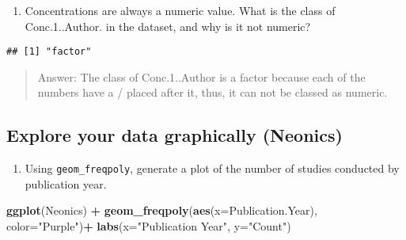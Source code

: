 \documentclass[]{article}
\newenvironment{Shaded}{\begin{snugshade}}{\end{snugshade}}
\newcommand{\DataTypeTok}[1]{\textcolor[rgb]{0.13,0.29,0.53}{#1}}
\newcommand{\DecValTok}[1]{\textcolor[rgb]{0.00,0.00,0.81}{#1}}
\newcommand{\KeywordTok}[1]{\textcolor[rgb]{0.13,0.29,0.53}{\textbf{#1}}}
\newcommand{\NormalTok}[1]{#1}
\newcommand{\OperatorTok}[1]{\textcolor[rgb]{0.81,0.36,0.00}{\textbf{#1}}}
\newcommand{\StringTok}[1]{\textcolor[rgb]{0.31,0.60,0.02}{#1}}
\providecommand{\tightlist}{%
  \setlength{\itemsep}{0pt}\setlength{\parskip}{0pt}}
\begin{document}
\begin{enumerate}
\def\labelenumi{\arabic{enumi}.}
\setcounter{enumi}{7}
\tightlist
\item
  Concentrations are always a numeric value. What is the class of
  Conc.1..Author. in the dataset, and why is it not numeric?
\end{enumerate}

\begin{Shaded}
\end{Shaded}

\begin{verbatim}
## [1] "factor"
\end{verbatim}

\begin{quote}
Answer: The class of Conc.1..Author is a factor because each of the
numbers have a / placed after it, thus, it can not be classed as
numeric.
\end{quote}

\hypertarget{explore-your-data-graphically-neonics}{%
\subsection{Explore your data graphically
(Neonics)}\label{explore-your-data-graphically-neonics}}

\begin{enumerate}
\def\labelenumi{\arabic{enumi}.}
\setcounter{enumi}{8}
\tightlist
\item
  Using \texttt{geom\_freqpoly}, generate a plot of the number of
  studies conducted by publication year.
\end{enumerate}

\begin{Shaded}
\begin{Highlighting}[]
\KeywordTok{ggplot}\NormalTok{(Neonics) }\OperatorTok{+}
\StringTok{  }\KeywordTok{geom_freqpoly}\NormalTok{(}\KeywordTok{aes}\NormalTok{(}\DataTypeTok{x=}\NormalTok{Publication.Year), }\DataTypeTok{color=}\StringTok{"Purple"}\NormalTok{)}\OperatorTok{+}
\StringTok{  }\KeywordTok{labs}\NormalTok{(}\DataTypeTok{x=}\StringTok{"Publication Year"}\NormalTok{, }\DataTypeTok{y=}\StringTok{"Count"}\NormalTok{)}
\end{Highlighting}
\end{Shaded}
\end{document}
